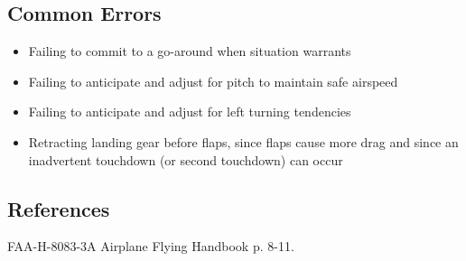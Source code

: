 \subsection{Common Errors}

\begin{itemize}
  \item Failing to commit to a go-around when situation warrants
  \item Failing to anticipate and adjust for pitch to maintain safe airspeed
  \item Failing to anticipate and adjust for left turning tendencies 
  \item Retracting landing gear before flaps, since flaps cause more drag and
    since an inadvertent touchdown (or second touchdown) can occur
\end{itemize}

\subsection{References}

FAA-H-8083-3A Airplane Flying Handbook p. 8-11.
